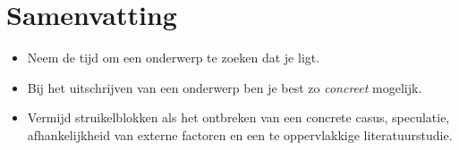 \section{Samenvatting}
\label{sec:onderwerp_samenvatting}

\begin{itemize}
  \item Neem de tijd om een onderwerp te zoeken dat je ligt.
  \item Bij het uitschrijven van een onderwerp ben je best zo \emph{concreet} mogelijk.
  \item Vermijd struikelblokken als het ontbreken van een concrete casus, speculatie, afhankelijkheid van externe factoren en een te oppervlakkige literatuurstudie.
\end{itemize}
